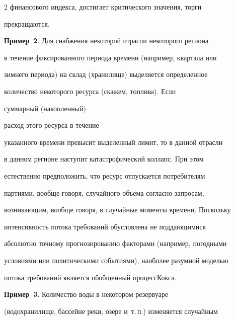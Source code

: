 \begin{multicols}{2}
финансового индекса, достигает критического значения, торги


прекращаются.








\smallskip





\noindent


\textbf{Пример~2}. Для снабжения некоторой отрасли некоторого региона


в течение фиксированного периода времени (например, квартала или


зимнего периода) на склад (хранилище) выделяется определенное


количество некоторого ресурса (скажем, топлива). Если {\it


суммарный $($накопленный$)$} расход этого ресурса в течение


указанного времени превысит выделенный лимит, то в данной отрасли


в данном регионе наступит катастрофический коллапс. При этом


естественно предположить, что ресурс отпускается потребителям


партиями, вообще говоря, случайного объема согласно запросам,


возникающим, вообще говоря, в случайные моменты времени. Поскольку


интенсивность потока требований обусловлена не поддающимися


абсолютно точному прогнозированию факторами (например, погодными


условиями или политическими событиями), наиболее разумной моделью


потока требований является обобщенный процесс\linebreak Кокса.


{ %





}





\smallskip





\noindent


\textbf{Пример~3}. Количество воды в некотором резервуаре


(водохранилище, бассейне реки, озере и~т.\,п.) изменяется случайным



\end{multicols}

